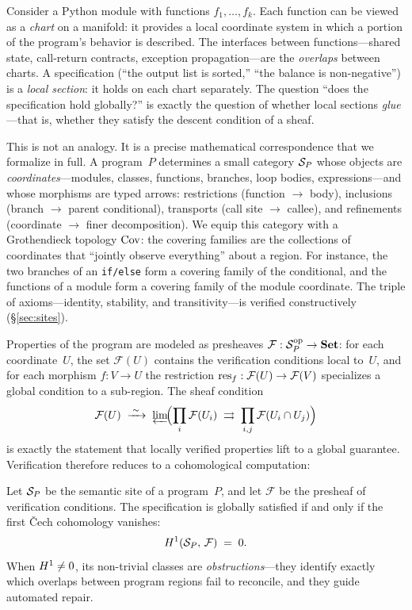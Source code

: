 Consider a Python module with functions $f_1, \ldots, f_k$.  Each function
can be viewed as a \emph{chart} on a manifold: it provides a local coordinate
system in which a portion of the program's behavior is described.  The
interfaces between functions---shared state, call-return contracts,
exception propagation---are the \emph{overlaps} between charts.  A
specification (``the output list is sorted,'' ``the balance is
non-negative'') is a \emph{local section}: it holds on each chart separately.
The question ``does the specification hold globally?'' is exactly the
question of whether local sections \emph{glue}---that is, whether they
satisfy the descent condition of a sheaf.

This is not an analogy.  It is a precise mathematical correspondence
that we formalize in full.
A program~$P$ determines a small category $\mathcal{S}_P$ whose objects are
\emph{coordinates}---modules, classes, functions, branches, loop bodies,
expressions---and whose morphisms are typed arrows: restrictions (function
$\to$ body), inclusions (branch $\to$ parent conditional), transports
(call site $\to$ callee), and refinements (coordinate $\to$ finer
decomposition).  We equip this category with a Grothendieck topology
$\mathrm{Cov}$: the covering families are the collections of coordinates that
``jointly observe everything'' about a region.  For instance, the two
branches of an \texttt{if/else} form a covering family of the
conditional, and the functions of a module form a covering family of the
module coordinate.  The triple of axioms---identity, stability, and
transitivity---is verified constructively (\S\ref{sec:sites}).

Properties of the program are modeled as presheaves
$\mathcal{F} : \mathcal{S}_P^{\mathrm{op}} \to \mathbf{Set}$: for each
coordinate~$U$, the set $\mathcal{F}(U)$ contains the verification
conditions local to~$U$, and for each morphism $f : V \to U$ the
restriction $\mathrm{res}_f : \mathcal{F}(U) \to \mathcal{F}(V)$ specializes a
global condition to a sub-region.  The sheaf condition
\[
  \mathcal{F}(U) \;\xrightarrow{\;\sim\;}\;
  \varprojlim\!\Bigl(
    \prod_i \mathcal{F}(U_i) \;\rightrightarrows\;
    \prod_{i,j} \mathcal{F}(U_i \cap U_j)
  \Bigr)
\]
is exactly the statement that locally verified properties lift to a global
guarantee.  Verification therefore reduces to a cohomological computation:

\begin{theorem}\label{thm:descent-informal}
Let $\mathcal{S}_P$ be the semantic site of a program~$P$, and let $\mathcal{F}$
be the presheaf of verification conditions.  The specification is globally
satisfied if and only if the first \v{C}ech cohomology vanishes:
\[
  H^{1}(\mathcal{S}_P,\, \mathcal{F}) \;=\; 0.
\]
When $H^{1} \neq 0$, its non-trivial classes are \emph{obstructions}---they
identify exactly which overlaps between program regions fail to reconcile, and
they guide automated repair.
\end{theorem}

